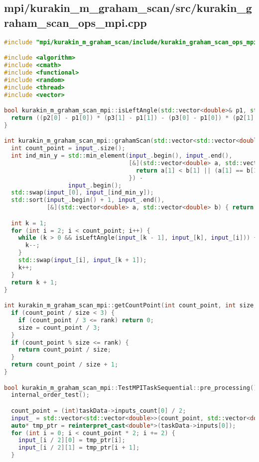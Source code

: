 \documentclass[12pt]{article}
\begin{document}
\subsection*{mpi/kurakin\_m\_graham\_scan/src/kurakin\_graham\_scan\_ops\_mpi.cpp}
\begin{lstlisting}[language=C++]
#include "mpi/kurakin_m_graham_scan/include/kurakin_graham_scan_ops_mpi.hpp"

#include <algorithm>
#include <cmath>
#include <functional>
#include <random>
#include <thread>
#include <vector>

bool kurakin_m_graham_scan_mpi::isLeftAngle(std::vector<double>& p1, std::vector<double>& p2, std::vector<double>& p3) {
  return ((p2[0] - p1[0]) * (p3[1] - p1[1]) - (p3[0] - p1[0]) * (p2[1] - p1[1])) < 0;
}

int kurakin_m_graham_scan_mpi::grahamScan(std::vector<std::vector<double>>& input_) {
  int count_point = input_.size();
  int ind_min_y = std::min_element(input_.begin(), input_.end(),
                                   [&](std::vector<double> a, std::vector<double> b) {
                                     return a[1] < b[1] || (a[1] == b[1] && a[0] > b[0]);
                                   }) -
                  input_.begin();
  std::swap(input_[0], input_[ind_min_y]);
  std::sort(input_.begin() + 1, input_.end(),
            [&](std::vector<double> a, std::vector<double> b) { return isLeftAngle(a, input_[0], b); });

  int k = 1;
  for (int i = 2; i < count_point; i++) {
    while (k > 0 && isLeftAngle(input_[k - 1], input_[k], input_[i])) {
      k--;
    }
    std::swap(input_[i], input_[k + 1]);
    k++;
  }
  return k + 1;
}

int kurakin_m_graham_scan_mpi::getCountPoint(int count_point, int size, int rank) {
  if (count_point / size < 3) {
    if (count_point / 3 <= rank) return 0;
    size = count_point / 3;
  }
  if (count_point % size <= rank) {
    return count_point / size;
  }
  return count_point / size + 1;
}

bool kurakin_m_graham_scan_mpi::TestMPITaskSequential::pre_processing() {
  internal_order_test();

  count_point = (int)taskData->inputs_count[0] / 2;
  input_ = std::vector<std::vector<double>>(count_point, std::vector<double>(2, 0));
  auto* tmp_ptr = reinterpret_cast<double*>(taskData->inputs[0]);
  for (int i = 0; i < count_point * 2; i += 2) {
    input_[i / 2][0] = tmp_ptr[i];
    input_[i / 2][1] = tmp_ptr[i + 1];
  }


\end{lstlisting}
\end{document}
